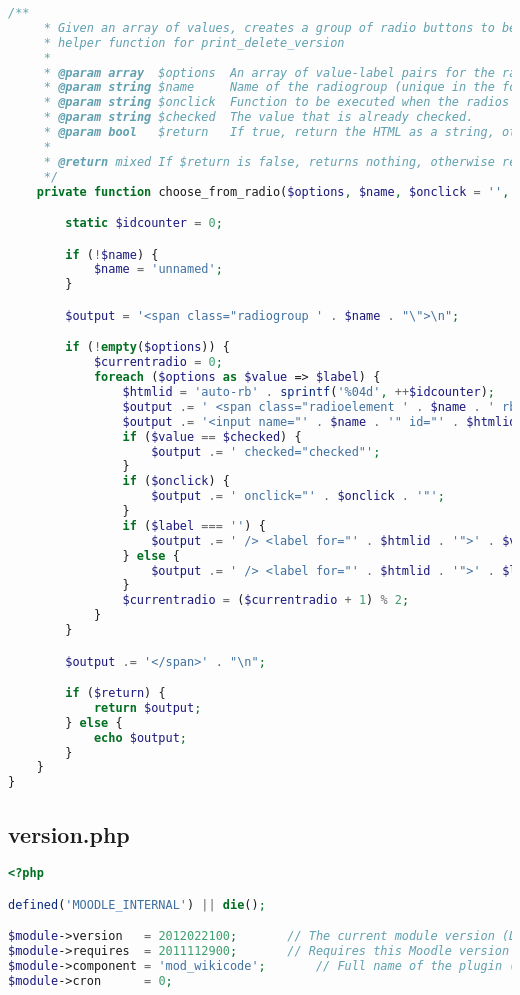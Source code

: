 \begin{lstlisting}[language=PHP]
    /**
     * Given an array of values, creates a group of radio buttons to be part of a form
     * helper function for print_delete_version
     *
     * @param array  $options  An array of value-label pairs for the radio group (values as keys).
     * @param string $name     Name of the radiogroup (unique in the form).
     * @param string $onclick  Function to be executed when the radios are clicked.
     * @param string $checked  The value that is already checked.
     * @param bool   $return   If true, return the HTML as a string, otherwise print it.
     *
     * @return mixed If $return is false, returns nothing, otherwise returns a string of HTML.
     */
    private function choose_from_radio($options, $name, $onclick = '', $checked = '', $return = false) {

        static $idcounter = 0;

        if (!$name) {
            $name = 'unnamed';
        }

        $output = '<span class="radiogroup ' . $name . "\">\n";

        if (!empty($options)) {
            $currentradio = 0;
            foreach ($options as $value => $label) {
                $htmlid = 'auto-rb' . sprintf('%04d', ++$idcounter);
                $output .= ' <span class="radioelement ' . $name . ' rb' . $currentradio . "\">";
                $output .= '<input name="' . $name . '" id="' . $htmlid . '" type="radio" value="' . $value . '"';
                if ($value == $checked) {
                    $output .= ' checked="checked"';
                }
                if ($onclick) {
                    $output .= ' onclick="' . $onclick . '"';
                }
                if ($label === '') {
                    $output .= ' /> <label for="' . $htmlid . '">' . $value . '</label></span>' . "\n";
                } else {
                    $output .= ' /> <label for="' . $htmlid . '">' . $label . '</label></span>' . "\n";
                }
                $currentradio = ($currentradio + 1) % 2;
            }
        }

        $output .= '</span>' . "\n";

        if ($return) {
            return $output;
        } else {
            echo $output;
        }
    }
}
\end{lstlisting}

\subsection{version.php}
\begin{lstlisting}[language=PHP]
<?php

defined('MOODLE_INTERNAL') || die();

$module->version   = 2012022100;       // The current module version (Date: YYYYMMDDXX)
$module->requires  = 2011112900;       // Requires this Moodle version
$module->component = 'mod_wikicode';       // Full name of the plugin (used for diagnostics)
$module->cron      = 0;
\end{lstlisting}

